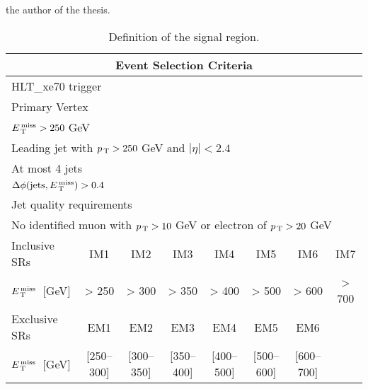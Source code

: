 the author of the thesis.
\begin{table}[!th]
  \centering
  \begin{tabular}{@{}l@{}c@{}c@{}c@{}c@{}c@{}c@{}c}
    \toprule
    \multicolumn{8}{c}{Event Selection Criteria} \\
    \midrule \midrule
    \multicolumn{8}{l}{HLT\_xe70 trigger} \\
    \multicolumn{8}{l}{Primary Vertex} \\
    \multicolumn{8}{l}{$E_\mathrm{\, T}^\mathrm{\, miss} > 250~$GeV} \\
    \multicolumn{8}{l}{Leading jet with $p_\mathrm{\, T} > 250~$GeV and $|\eta| < 2.4$} \\
    \multicolumn{8}{l}{At most 4 jets} \\
    \multicolumn{8}{l}{$\Delta \phi (\mathrm{jets}, E_\mathrm{\, T}^\mathrm{\, miss}) > 0.4$} \\
    \multicolumn{8}{l}{Jet quality requirements} \\
    \multicolumn{8}{l}{No identified muon with $p_\mathrm{\, T} > 10~$GeV or electron of
    $p_\mathrm{\, T} > 20~$GeV} \\
    \midrule
    Inclusive SRs & IM1 & IM2 & IM3 & IM4 & IM5 & IM6 & IM7 \\
    $E_\mathrm{\, T}^\mathrm{\, miss}$~[GeV] & > 250 & > 300 & > 350 & > 400 & > 500 & > 600 & > 700 \\
    \midrule
    Exclusive SRs & EM1 & EM2 & EM3 & EM4 & EM5 & EM6 \\
    $E_\mathrm{\, T}^\mathrm{\, miss}$~[GeV] & [250--300] & [300--350] & [350--400] & [400--500] &
    [500--600] & [600--700] \\
    \bottomrule
  \end{tabular}
  \caption{Definition of the signal region.}
  \label{tab:event_selection}
\end{table}
